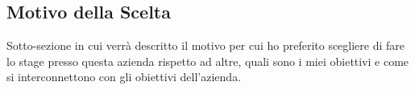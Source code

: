 \subsection{Motivo della Scelta}

Sotto-sezione in cui verrà descritto il motivo per cui ho preferito scegliere di fare lo stage presso questa azienda rispetto ad altre, quali sono i miei obiettivi e come si interconnettono con gli obiettivi dell'azienda.